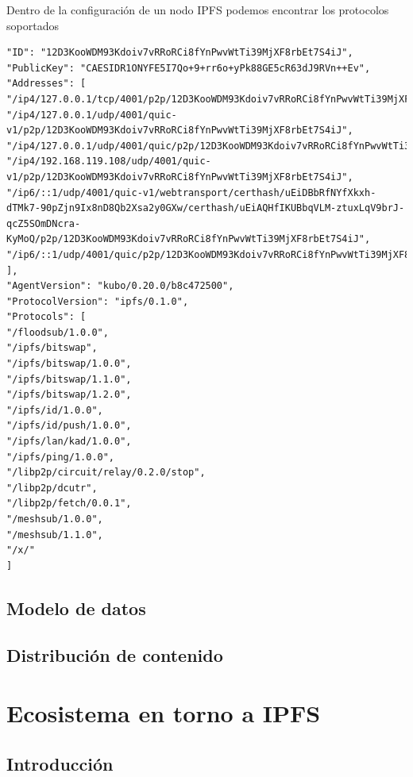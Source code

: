 Dentro de la configuración de un nodo IPFS podemos encontrar los protocolos soportados
\begin{verbatim}
"ID": "12D3KooWDM93Kdoiv7vRRoRCi8fYnPwvWtTi39MjXF8rbEt7S4iJ",
"PublicKey": "CAESIDR1ONYFE5I7Qo+9+rr6o+yPk88GE5cR63dJ9RVn++Ev",
"Addresses": [
"/ip4/127.0.0.1/tcp/4001/p2p/12D3KooWDM93Kdoiv7vRRoRCi8fYnPwvWtTi39MjXF8rbEt7S4iJ",
"/ip4/127.0.0.1/udp/4001/quic-v1/p2p/12D3KooWDM93Kdoiv7vRRoRCi8fYnPwvWtTi39MjXF8rbEt7S4iJ",
"/ip4/127.0.0.1/udp/4001/quic/p2p/12D3KooWDM93Kdoiv7vRRoRCi8fYnPwvWtTi39MjXF8rbEt7S4iJ",
"/ip4/192.168.119.108/udp/4001/quic-v1/p2p/12D3KooWDM93Kdoiv7vRRoRCi8fYnPwvWtTi39MjXF8rbEt7S4iJ",
"/ip6/::1/udp/4001/quic-v1/webtransport/certhash/uEiDBbRfNYfXkxh-dTMk7-90pZjn9Ix8nD8Qb2Xsa2y0GXw/certhash/uEiAQHfIKUBbqVLM-ztuxLqV9brJ-qcZ5SOmDNcra-KyMoQ/p2p/12D3KooWDM93Kdoiv7vRRoRCi8fYnPwvWtTi39MjXF8rbEt7S4iJ",
"/ip6/::1/udp/4001/quic/p2p/12D3KooWDM93Kdoiv7vRRoRCi8fYnPwvWtTi39MjXF8rbEt7S4iJ"
],
"AgentVersion": "kubo/0.20.0/b8c472500",
"ProtocolVersion": "ipfs/0.1.0",
"Protocols": [
"/floodsub/1.0.0",
"/ipfs/bitswap",
"/ipfs/bitswap/1.0.0",
"/ipfs/bitswap/1.1.0",
"/ipfs/bitswap/1.2.0",
"/ipfs/id/1.0.0",
"/ipfs/id/push/1.0.0",
"/ipfs/lan/kad/1.0.0",
"/ipfs/ping/1.0.0",
"/libp2p/circuit/relay/0.2.0/stop",
"/libp2p/dcutr",
"/libp2p/fetch/0.0.1",
"/meshsub/1.0.0",
"/meshsub/1.1.0",
"/x/"
]
\end{verbatim}

\subsection{Modelo de datos}
\subsection{Distribución de contenido}

\section{Ecosistema en torno a IPFS}\label{sect:ecosistema}

\subsection{Introducción}
